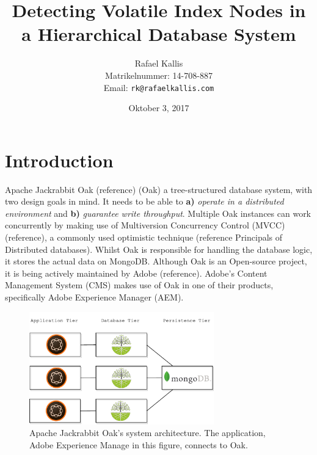 \documentclass[abstracton,12pt]{scrreprt}
\title{Detecting Volatile Index Nodes in a Hierarchical Database System}
\author{
  Rafael Kallis\\[-5pt]
  \scriptsize Matrikelnummer: 14-708-887\\[-5pt]
  \scriptsize Email: \texttt{rk@rafaelkallis.com}
}
\date{\vspace*{2cm}Oktober 3, 2017}
\begin{document}
\maketitle





\chapter{Introduction}
 

Apache Jackrabbit Oak (reference) (Oak) a tree-structured database system, with two design goals in mind.
It needs to be able to \textbf{a)} \textit{operate in a distributed environment} and \textbf{b)} \textit{guarantee write throughput}.
Multiple Oak instances can work concurrently by making use of Multiversion Concurrency Control (MVCC) (reference), a commonly used optimistic technique (reference Principals of Distributed databases).
Whilst Oak is responsible for handling the database logic, it stores the actual data on MongoDB.
Although Oak is an Open-source project, it is being actively maintained by Adobe (reference).
Adobe's Content Management System (CMS) makes use of Oak in one of their products, specifically Adobe Experience Manager (AEM).

\begin{figure}[h]
    \label{fig:architecture}
    \centering
    \includegraphics[width=8cm]{architecture}
    \caption{Apache Jackrabbit Oak's system architecture. The application, Adobe Experience Manage in this figure, connects to Oak.}
\end{figure}
\end{document}
